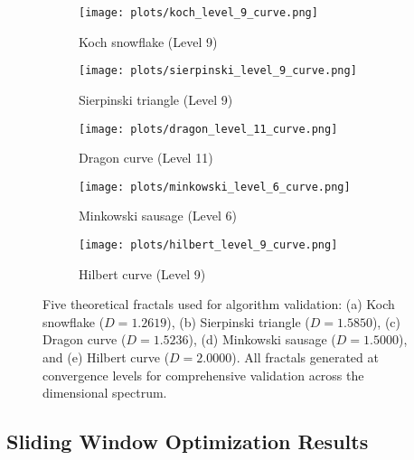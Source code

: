\documentclass[preprint,12pt]{elsarticle}
\begin{document}
\begin{figure}[H]
\centering
\vspace{-0.5cm}
\begin{subfigure}[b]{0.45\textwidth}
    \centering
    \texttt{[image: plots/koch\_level\_9\_curve.png]}
    \caption{Koch snowflake (Level 9)}
    \label{fig:koch_fractal}
\end{subfigure}
\hfill
\begin{subfigure}[b]{0.45\textwidth}
    \centering
    \texttt{[image: plots/sierpinski\_level\_9\_curve.png]}
    \caption{Sierpinski triangle (Level 9)}
    \label{fig:sierpinski_fractal}
\end{subfigure}

\vspace{0.3cm}

\begin{subfigure}[b]{0.45\textwidth}
    \centering
    \texttt{[image: plots/dragon\_level\_11\_curve.png]}
    \caption{Dragon curve (Level 11)}
    \label{fig:dragon_fractal}
\end{subfigure}
\hfill
\begin{subfigure}[b]{0.45\textwidth}
    \centering
    \texttt{[image: plots/minkowski\_level\_6\_curve.png]}
    \caption{Minkowski sausage (Level 6)}
    \label{fig:minkowski_fractal}
\end{subfigure}

\vspace{0.3cm}

\begin{subfigure}[b]{0.45\textwidth}
    \centering
    \texttt{[image: plots/hilbert\_level\_9\_curve.png]}
    \caption{Hilbert curve (Level 9)}
    \label{fig:hilbert_fractal}
\end{subfigure}
\vspace{-0.3cm}
\caption{\small Five theoretical fractals used for algorithm validation: (a) Koch snowflake ($D = 1.2619$), (b) Sierpinski triangle ($D = 1.5850$), (c) Dragon curve ($D = 1.5236$), (d) Minkowski sausage ($D = 1.5000$), and (e) Hilbert curve ($D = 2.0000$). All fractals generated at convergence levels for comprehensive validation across the dimensional spectrum.}
\label{fig:five_fractals}
\vspace{-0.5cm}
\end{figure}

\subsection{Sliding Window Optimization Results}
\label{subsec:sliding_window_results}
\end{document}
